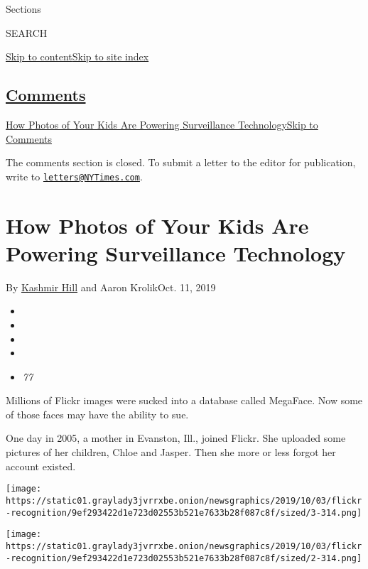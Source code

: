 Sections

SEARCH

\protect\hyperlink{site-content}{Skip to
content}\protect\hyperlink{site-index}{Skip to site index}

\hypertarget{comments}{%
\subsection{\texorpdfstring{\protect\hyperlink{commentsContainer}{Comments}}{Comments}}\label{comments}}

\href{}{How Photos of Your Kids Are Powering Surveillance
Technology}\href{}{Skip to Comments}

The comments section is closed. To submit a letter to the editor for
publication, write to
\href{mailto:letters@NYTimes.com}{\nolinkurl{letters@NYTimes.com}}.

\hypertarget{how-photos-of-your-kids-are-powering-surveillance-technology}{%
\section{How Photos of Your Kids Are Powering Surveillance
Technology}\label{how-photos-of-your-kids-are-powering-surveillance-technology}}

By \href{https://www.nytimes3xbfgragh.onion/by/kashmir-hill}{Kashmir
Hill} and Aaron KrolikOct. 11, 2019

\begin{itemize}
\item
\item
\item
\item
\item
  \emph{77}
\end{itemize}

Millions of Flickr images were sucked into a database called MegaFace.
Now some of those faces may have the ability to sue.

One day in 2005, a mother in Evanston, Ill., joined Flickr. She uploaded
some pictures of her children, Chloe and Jasper. Then she more or less
forgot her account existed.

\texttt{[image: https://static01.graylady3jvrrxbe.onion/newsgraphics/2019/10/03/flickr-recognition/9ef293422d1e723d02553b521e7633b28f087c8f/sized/3-314.png]}

\texttt{[image: https://static01.graylady3jvrrxbe.onion/newsgraphics/2019/10/03/flickr-recognition/9ef293422d1e723d02553b521e7633b28f087c8f/sized/2-314.png]}

